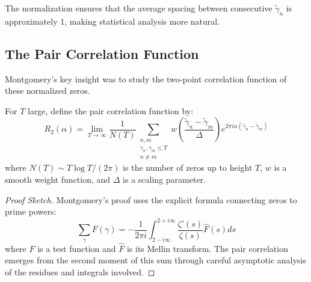 \begin{remark}
The normalization ensures that the average spacing between consecutive $\tilde{\gamma}_n$ is approximately 1, making statistical analysis more natural.
\end{remark}

\subsection{The Pair Correlation Function}

Montgomery's key insight was to study the two-point correlation function of these normalized zeros.

\begin{definition}
\label{def:montgomery_pair_correlation}
For $T$ large, define the pair correlation function by:
\begin{equation}
R_2(\alpha) = \lim_{T \to \infty} \frac{1}{N(T)} \sum_{\substack{n,m \\ \gamma_n, \gamma_m \leq T \\ n \neq m}} w\left(\frac{\tilde{\gamma}_n - \tilde{\gamma}_m}{\Delta}\right) e^{2\pi i \alpha (\tilde{\gamma}_n - \tilde{\gamma}_m)}
\label{eq:montgomery_correlation}
\end{equation}
where $N(T) \sim T \log T/(2\pi)$ is the number of zeros up to height $T$, $w$ is a smooth weight function, and $\Delta$ is a scaling parameter.
\end{definition}


\begin{proof}[Proof Sketch]
Montgomery's proof uses the explicit formula connecting zeros to prime powers:
\begin{equation}
\sum_{\gamma} F(\gamma) = -\frac{1}{2\pi i} \int_{2-i\infty}^{2+i\infty} \frac{\zeta'(s)}{\zeta(s)} \hat{F}(s) ds
\end{equation}
where $F$ is a test function and $\hat{F}$ is its Mellin transform. The pair correlation emerges from the second moment of this sum through careful asymptotic analysis of the residues and integrals involved.
\end{proof}

